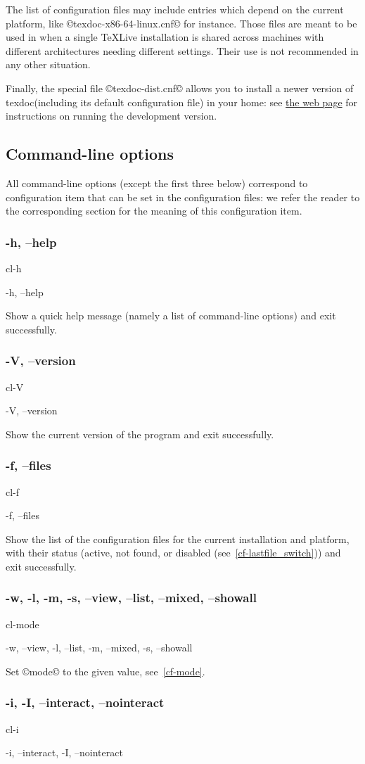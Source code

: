 \documentclass[a4paper, oneside]{scrartcl}
\newcommand\texlive{%
  \TeX{}\thinspace Live\xspace}
\newif\ifframed
\newenvironment{cmdsubsub}[2]{%
  \framedfalse \commandes\subsubsection{#1}{#2}%
  }{%
  \endcommandes}
\newcommand\texdoc{texdoc\xspace}
\begin{document}
The list of configuration files may include entries which depend on the
current platform, like ©texdoc-x86-64-linux.cnf© for instance. Those files are
meant to be used in when a single \texlive installation is shared across
machines with different architectures needing different settings. Their use is
not recommended in any other situation.

Finally, the special file ©texdoc-dist.cnf© allows you to install a newer
version of \texdoc (including its default configuration file) in your home:
see \href{http://tug.org/texdoc/dev/}{the web page} for instructions on
running the development version.

\subsection{Command-line options}\label{ss-cl}

All command-line options (except the first three below) correspond to
configuration item that can be set in the configuration files: we refer
the reader to the corresponding section for the meaning of this configuration
item.

\begin{cmdsubsub}{-h, --help}{cl-h}
  -h, --help
\end{cmdsubsub}

Show a quick help message (namely a list of command-line options) and exit
successfully.

\begin{cmdsubsub}{-V, --version}{cl-V}
  -V, --version
\end{cmdsubsub}

Show the current version of the program and exit successfully.

\begin{cmdsubsub}{-f, --files}{cl-f}
  -f, --files
\end{cmdsubsub}

Show the list of the configuration files for the current installation and
platform, with their status (active, not found, or disabled
(see~\ref{cf-lastfile_switch})) and exit successfully.

\begin{cmdsubsub}{-w, -l, -m, -s, --view, --list, --mixed, --showall}{cl-mode}
  -w, --view, -l, --list, -m, --mixed, -s, --showall
\end{cmdsubsub}

Set ©mode© to the given value, see~\ref{cf-mode}.

\begin{cmdsubsub}{-i, -I, --interact, --nointeract}{cl-i}
  -i, --interact, -I, --nointeract
\end{cmdsubsub}
\end{document}
